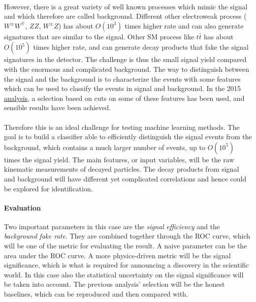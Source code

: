 \documentclass[11pt]{article}
\begin{document}
\paragraph{}
However, there is a great variety of well known processes which mimic the signal and which therefore are called background. Different other electroweak process ($W^{\pm}W^{\mp}$, $ZZ$, $W^{\pm}Z$) has about $O(10^3)$ times higher rate and can also generate signatures that are similar to the signal. Other SM process like $t\bar{t}$ has about $O(10^5)$ times higher rate, and can generate decay products that fake the signal signatures in the detector. 
The challenge is thus the small signal yield compared with the enormous and complicated background. The way to distinguish between the signal and the background is to characterize the events with some features which can be used to classify the events in signal and background. In the 2015 \href{https://arxiv.org/abs/1610.05088}{analysis}, a selection based on cuts on some of these features has been used, and sensible results have been achieved. 

\paragraph{}
Therefore this is an ideal challenge for testing machine learning methods. The goal is to build a classifier able to efficiently distinguish the signal events from the background, which contains a much larger number of events, up to $O(10^5)$ times the signal yield. The main features, or input variables, will be the raw kinematic measurements of decayed particles. The decay products from signal and background will have different yet complicated correlations and hence could be explored for identification.

\paragraph{Evaluation}
Two important parameters in this case are the \textit{signal efficiency} and the \textit{background fake rate}. They are combined together through the ROC curve, which will be one of the metric for evaluating the result. A naive parameter can be the area under the ROC curve. A more physics-driven metric will be the signal significance, which is what is required for announcing a discovery in the scientific world. In this case also the statistical uncertainty on the signal significance will be taken into account. The previous analysis' selection will be the honest baselines, which can be reproduced and then compared with. 
\end{document}
